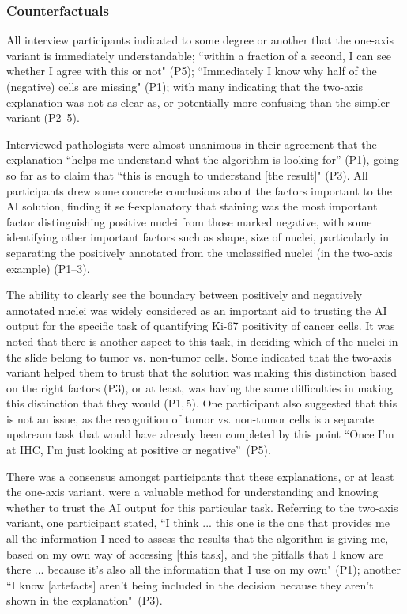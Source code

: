 \documentclass[final,5p,times,twocolumn,hyphens]{elsarticle}
\begin{document}
\subsubsection{Counterfactuals}

All interview participants indicated to some degree or another that the one-axis variant is immediately understandable; ``within a fraction of a second, I can see whether I agree with this or not" (P5); ``Immediately I know why half of the (negative) cells are missing" (P1); with many indicating that the two-axis explanation was not as clear as, or potentially more confusing than the simpler variant (P2--5). 

Interviewed pathologists were almost unanimous in their agreement that the explanation ``helps me understand what the algorithm is looking for” (P1), going so far as to claim that ``this is enough to understand [the result]" (P3). All participants drew some concrete conclusions about the factors important to the AI solution, finding it self-explanatory that staining was the most important factor distinguishing positive nuclei from those marked negative, with some identifying other important factors such as shape, size of nuclei, particularly in separating the positively annotated from the unclassified nuclei (in the two-axis example) (P1--3).

The ability to clearly see the boundary between positively and negatively annotated nuclei was widely considered as an important aid to trusting the AI output for the specific task of quantifying Ki-67 positivity of cancer cells. It was noted that there is another aspect to this task, in deciding which of the nuclei in the slide belong to tumor vs. non-tumor cells. 
Some indicated that the two-axis variant helped them to trust that the solution was making this distinction based on the right factors (P3), or at least, was having the same difficulties in making this distinction that they would (P1,\,5). One participant also suggested that this is not an issue, as the recognition of tumor vs. non-tumor cells is a separate upstream task that would have already been completed by this point ``Once I'm at IHC, I'm just looking at positive or negative''~(P5).

There was a consensus amongst participants that these explanations, or at least the one-axis variant, were a valuable method for understanding and knowing whether to trust the AI output for this particular task. Referring to the two-axis variant, one participant stated, “I think ... this one is the one that provides me all the information I need to assess the results that the algorithm is giving me, based on my own way of accessing [this task], and the pitfalls that I know are there ... because it's also all the information that I use on my own" (P1); another ``I know [artefacts] aren’t being included in the decision because they aren’t shown in the explanation"~(P3). 
\end{document}

